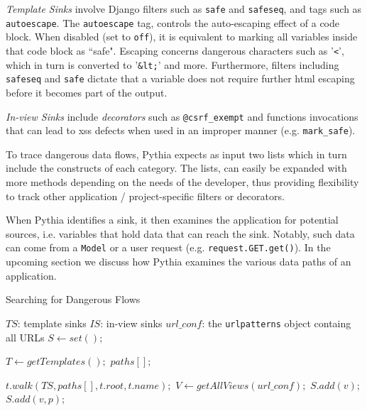 {\it Template Sinks} involve Django filters
such as {\tt safe} and {\tt safeseq},
and tags such as {\tt autoescape}.
The {\tt autoescape} tag,
controls the auto-escaping effect of a code block.
When disabled (set to {\tt off}),
it is equivalent to marking all variables
inside that code block as ``safe".
Escaping concerns dangerous characters
such as '{\tt <}', which in turn is 
converted to '{\tt \&lt;}' and more.
Furthermore,
filters including {\tt safeseq} and
{\tt safe} dictate that a variable
does not require further {\sc html} escaping
before it becomes part of  the output.

{\it In-view Sinks} include {\it decorators}
such as {\tt @csrf\_exempt} and functions
invocations that can lead to {\sc xss}
defects when used in an improper manner
(e.g. {\tt mark\_safe}).

To trace dangerous data flows,
Pythia expects as input two lists which in turn
include the constructs of each category.
The lists, can easily be expanded with more methods 
depending on the needs of the developer,
thus providing flexibility to track other 
application / project-specific filters
or decorators.

When Pythia identifies a sink,
it then examines the application
for potential sources,
i.e. variables that hold data that
can reach the sink.
Notably,
such data can come from a {\tt Model}
or a user request
(e.g. {\tt request.GET.get()}).
In the upcoming section we discuss
how Pythia examines the various data paths
of an application.

\begin{algorithm}[t]
\caption{Searching for Dangerous Flows}
\label{alg:explore}
\begin{algorithmic}[1]
 $TS$: template sinks
 $IS$: in-view sinks
 $url\_conf$: the {\tt urlpatterns} object containg all URLs
\State $S \gets set();$

\State $T \gets getTemplates();$
\State $paths[];$

    \State $t.walk(TS, paths[], t.root, t.name);$
\EndFor
\State $V \gets getAllViews(url\_conf);$
        \State $S.add(v);$
    \EndIf
            \State $S.add(v, p);$
        \EndIf
    \EndFor 
\EndFor
\EndFunction
\end{algorithmic}
\end{algorithm}

